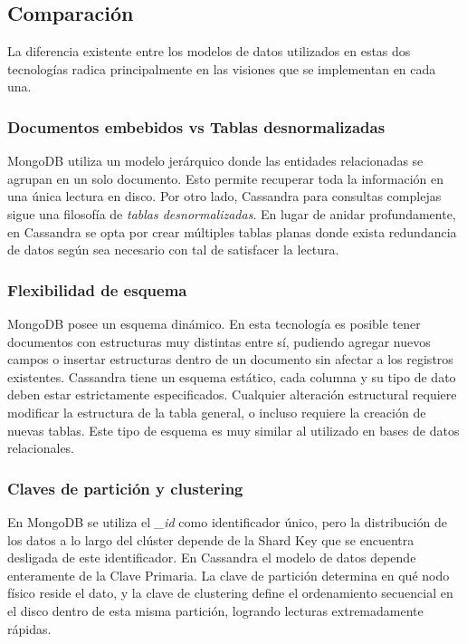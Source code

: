 \documentclass[11pt,a4paper]{article}
\begin{document}
\subsection{Comparación}
La diferencia existente entre los modelos de datos utilizados en estas dos tecnologías radica principalmente
en las visiones que se implementan en cada una.

\subsubsection{Documentos embebidos vs Tablas desnormalizadas}
MongoDB utiliza un modelo jerárquico donde las entidades relacionadas se agrupan en un solo documento.
Esto permite recuperar toda la información en una única lectura en disco. Por otro lado, Cassandra 
para consultas complejas sigue una filosofía de \textit{tablas desnormalizadas}. En lugar de anidar 
profundamente, en Cassandra se opta por crear múltiples tablas planas donde exista redundancia de datos
según sea necesario con tal de satisfacer la lectura.

\subsubsection{Flexibilidad de esquema}
MongoDB posee un esquema dinámico. En esta tecnología es posible tener documentos con estructuras muy distintas 
entre sí, pudiendo agregar nuevos campos o insertar estructuras dentro de un documento sin afectar a los registros
existentes. Cassandra tiene un esquema estático, cada columna y su tipo de dato deben estar estrictamente especificados.
Cualquier alteración estructural requiere modificar la estructura de la tabla general, o incluso requiere la
creación de nuevas tablas. Este tipo de esquema es muy similar al utilizado en bases de datos relacionales.

\subsubsection{Claves de partición y clustering}
En MongoDB se utiliza el \textit{\_id} como identificador único, pero la distribución de los datos a lo largo del 
clúster depende de la Shard Key que se encuentra desligada de este identificador. En Cassandra el modelo de datos 
depende enteramente de la Clave Primaria. La clave de partición determina en qué nodo físico reside el dato, y la
clave de clustering define el ordenamiento secuencial en el disco dentro de esta misma partición, logrando lecturas 
extremadamente rápidas.
\end{document}
